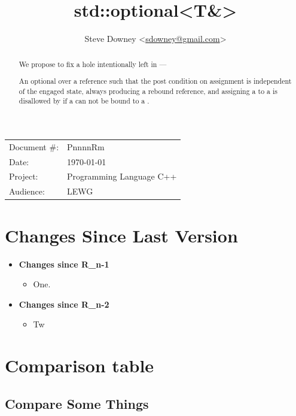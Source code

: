 \documentclass[a4paper,10pt,oneside,openany,final,article]{memoir}
\begin{document}
\title{std::optional<T\&>}
\author{Steve Downey \small<\href{mailto:sdowney@gmail.com}{sdowney@gmail.com}>}
\date{} %
\maketitle

\begin{flushright}
  \begin{tabular}{ll}
    Document \#: & PnnnnRm \\
    Date: & \today \\
    Project: & Programming Language C++ \\
    Audience: & LEWG
  \end{tabular}
\end{flushright}

\begin{abstract}
  We propose to fix a hole intentionally left in  ---

  An optional over a reference such that the post condition on assignment is independent of the engaged state, always producing a rebound reference, and assigning a  to a  is disallowed by  if a  can not be bound to a .
\end{abstract}

\tableofcontents*

\chapter*{Changes Since Last Version}

\begin{itemize}
\item \textbf{Changes since R_{n-1}}
  \begin{itemize}
  \item One.
  \end{itemize}
\item \textbf{Changes since R_{n-2}}
  \begin{itemize}
  \item Tw
  \end{itemize}
\end{itemize}

\chapter{Comparison table}
\section{Compare Some Things}
\end{document}
